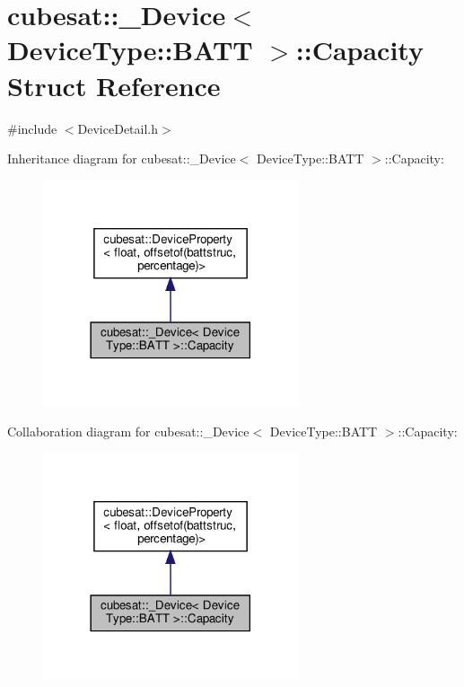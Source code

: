 \hypertarget{structcubesat_1_1__Device_3_01DeviceType_1_1BATT_01_4_1_1Capacity}{}\section{cubesat\+:\+:\+\_\+\+Device$<$ Device\+Type\+:\+:B\+A\+TT $>$\+:\+:Capacity Struct Reference}
\label{structcubesat_1_1__Device_3_01DeviceType_1_1BATT_01_4_1_1Capacity}


{\ttfamily \#include $<$Device\+Detail.\+h$>$}



Inheritance diagram for cubesat\+:\+:\+\_\+\+Device$<$ Device\+Type\+:\+:B\+A\+TT $>$\+:\+:Capacity\+:\nopagebreak
\begin{figure}[H]
\begin{center}
\leavevmode
\includegraphics[width=213pt]{structcubesat_1_1__Device_3_01DeviceType_1_1BATT_01_4_1_1Capacity__inherit__graph}
\end{center}
\end{figure}


Collaboration diagram for cubesat\+:\+:\+\_\+\+Device$<$ Device\+Type\+:\+:B\+A\+TT $>$\+:\+:Capacity\+:\nopagebreak
\begin{figure}[H]
\begin{center}
\leavevmode
\includegraphics[width=213pt]{structcubesat_1_1__Device_3_01DeviceType_1_1BATT_01_4_1_1Capacity__coll__graph}
\end{center}
\end{figure}
